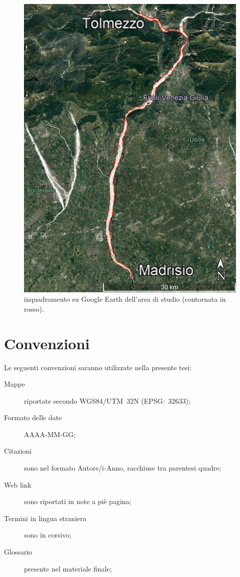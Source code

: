 \begin{figure}
	\centering
	\includegraphics[width=.7\textwidth]{files/overview_gearth.jpg}
	\caption[inquadramento su Google Earth dell'area di studio]{inquadramento su Google Earth dell'area di studio (contornata in rosso).}
	\label{fig:overview-gearth}
\end{figure}



\section{Convenzioni}
Le seguenti convenzioni saranno utilizzate nella presente tesi:
\begin{description}
	\item[Mappe] riportate secondo WGS84/UTM~32N (EPSG:~32633);
	\item[Formato delle date] AAAA-MM-GG;
	\item[Citazioni] sono nel formato Autore/i-Anno, racchiuse tra parentesi quadre;
	\item[Web link] sono riportati in note a piè pagina;
	\item[Termini in lingua straniera] sono in corsivo;
	\item[Glossario] presente nel materiale finale;
\end{description}



